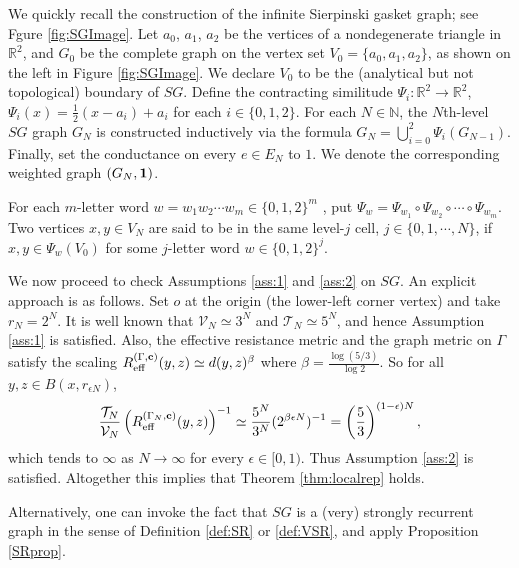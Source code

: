 \documentclass[11pt]{amsart}
\theoremstyle{plain}
\theoremstyle{definition}
\theoremstyle{remark}
\begin{document}
We quickly recall the construction of the infinite Sierpinski gasket graph; see Fgure \ref{fig:SGImage}. Let $a_0$, $a_1$, $a_2$ be the vertices of a nondegenerate triangle in $\mathbb{R}^2$, and $G_0$ be the complete graph on the vertex set $V_0 = \{a_0, a_1, a_2\}$, as shown on the left in Figure \ref{fig:SGImage}. We declare $V_0$ to be the (analytical but not topological) boundary of $SG$. Define the contracting similitude $\Psi_i : \mathbb{R}^2 \to\mathbb{R}^2$, $\Psi_i(x) = \frac{1}{2}(x-a_i) + a_i $ for each $i\in \{0,1,2\}$. For each $N\in \mathbb{N}$, the $N$th-level $SG$ graph $G_N$ is constructed inductively via the formula $G_N = \bigcup_{i=0}^2 \Psi_i(G_{N-1})$. Finally, set the conductance on every $e\in E_N$ to $1$. We denote the corresponding weighted graph $(G_N, {\bf 1})$.

For each $m$-letter word $w=w_1 w_2 \cdots w_m \in \{0,1,2\}^m$ , put $\Psi_w = \Psi_{w_1} \circ \Psi_{w_2} \circ \cdots \circ \Psi_{w_m}$. Two vertices $x, y\in V_N$ are said to be in the same level-$j$ cell, $j\in \{0,1,\cdots, N\}$, if $x, y\in \Psi_w(V_0)$ for some $j$-letter word $w \in \{0,1,2\}^j$.

We now proceed to check Assumptions \ref{ass:1} and \ref{ass:2} on $SG$. An explicit approach is as follows. Set $o$ at the origin (the lower-left corner vertex) and take $r_N = 2^N$. It is well known that $\mathcal{V}_N \simeq 3^N$ and $\mathcal{T}_N \simeq 5^N$, and hence Assumption \ref{ass:1} is satisfied. Also, the effective resistance metric and the graph metric on $\Gamma$ satisfy the scaling $R_{\rm eff}^{(\Gamma,{\bf c})}(y,z) \simeq d(y,z)^\beta$ where $\beta = \frac{\log(5/3)}{\log 2}$. So for all $y, z\in B(x, r_{\epsilon N})$,
\begin{align}
\frac{\mathcal{T}_N}{\mathcal{V}_N} \left(R_{\rm eff}^{(\Gamma_N,{\bf c})}(y,z)\right)^{-1} \simeq \frac{5^N}{3^N} (2^{\beta \epsilon N})^{-1} = \left(\frac{5}{3}\right)^{(1-\epsilon)N},
\end{align}
which tends to $\infty$ as $N\to\infty$ for every $\epsilon\in [0,1)$. Thus Assumption \ref{ass:2} is satisfied. Altogether this implies that Theorem \ref{thm:localrep} holds.

Alternatively, one can invoke the fact that $SG$ is a (very) strongly recurrent graph in the sense of Definition \ref{def:SR} or \ref{def:VSR}, and apply Proposition \ref{SRprop}.
\end{document}
